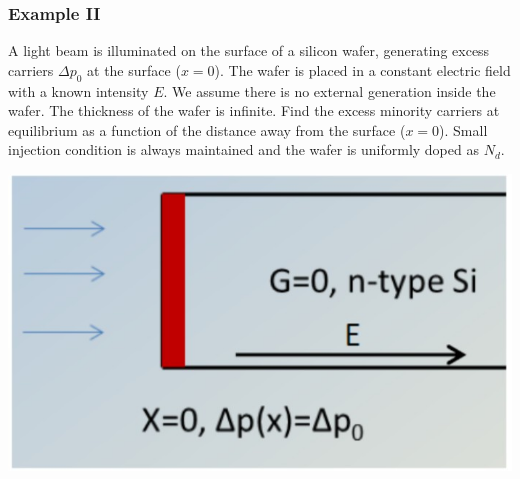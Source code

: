\documentclass{beamer}
\begin{document}
    \begin{frame} \frametitle{Example II}
        \par A light beam is illuminated on the surface of a silicon wafer, generating excess carriers $\Delta p_0$ at the surface ($x = 0$). The wafer is placed in a constant electric field with a known intensity $E$. We assume there is no external generation inside the wafer. The thickness of the wafer is infinite. Find the excess minority carriers at equilibrium as a function of the distance away from the surface ($x = 0$). Small injection condition is always maintained and the wafer is uniformly doped as $N_d$. \\[3em]
        \begin{minipage}{\linewidth}
            \begin{minipage}{0.3\linewidth}
                \includegraphics[width=\linewidth]{Example-2.jpg}
            \end{minipage}
            \begin{minipage}{0.69\linewidth}
            \end{minipage}
        \end{minipage}
        
    \end{frame}
\end{document}
